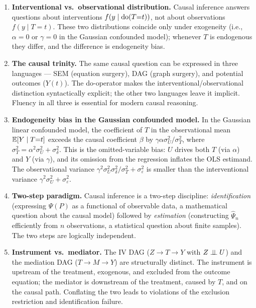 \documentclass[master.tex]{subfiles}
\begin{document}
\begin{enumerate}
  \item \textbf{Interventional vs.\ observational distribution.}
        Causal inference answers questions about interventions
        $f(y \mid \mathrm{do}(T{=}t))$, not about observations $f(y \mid T{=}t)$.
        These two distributions coincide only under exogeneity (i.e.,
        $\alpha = 0$ or $\gamma = 0$ in the Gaussian confounded model); whenever $T$ is endogenous
        they differ, and the difference is endogeneity bias.

  \item \textbf{The causal trinity.}
        The same causal question can be expressed in three languages ---
        SEM (equation surgery), DAG (graph surgery), and potential outcomes
        ($Y(t)$).  The do-operator makes the interventional/observational
        distinction syntactically explicit; the other two languages leave
        it implicit.  Fluency in all three is essential for modern causal
        reasoning.

  \item \textbf{Endogeneity bias in the Gaussian confounded model.}
        In the Gaussian linear confounded model, the coefficient of $T$ in
        the observational mean $\mathbb{E}[Y \mid T{=}t]$ exceeds the causal
        coefficient $\beta$ by $\gamma\alpha\sigma_U^2/\sigma_T^2$, where
        $\sigma_T^2 = \alpha^2\sigma_U^2 + \sigma_\delta^2$.  This is the
        omitted-variable bias: $U$ drives both $T$ (via $\alpha$) and $Y$
        (via $\gamma$), and its omission from the regression inflates the
        OLS estimand.  The observational variance
        $\gamma^2\sigma_U^2\sigma_\delta^2/\sigma_T^2 + \sigma_\varepsilon^2$
        is smaller than the interventional variance
        $\gamma^2\sigma_U^2 + \sigma_\varepsilon^2$.

  \item \textbf{Two-step paradigm.}
        Causal inference is a two-step discipline: \emph{identification}
        (expressing $\Psi(P)$ as a functional of observable data, a
        mathematical question about the causal model) followed by
        \emph{estimation} (constructing $\hat{\Psi}_n$ efficiently from $n$
        observations, a statistical question about finite samples).  The two
        steps are logically independent.

  \item \textbf{Instrument vs.\ mediator.}
        The IV DAG ($Z \to T \to Y$ with $Z \perp\!\!\!\perp U$) and the mediation
        DAG ($T \to M \to Y$) are structurally distinct.  The instrument is
        upstream of the treatment, exogenous, and excluded from the outcome
        equation; the mediator is downstream of the treatment, caused by
        $T$, and on the causal path.  Conflating the two leads to violations
        of the exclusion restriction and identification failure.
\end{enumerate}
\end{document}
